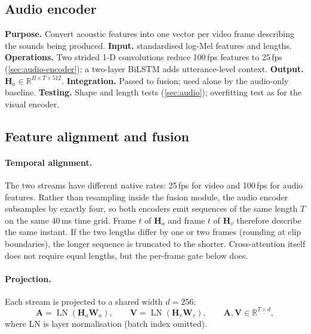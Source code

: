 \subsection{Audio encoder}
\textbf{Purpose.} Convert acoustic features into one vector per video frame
describing the sounds being produced.
\textbf{Input.}  standardised log-Mel features and lengths.
\textbf{Operations.} Two strided 1-D convolutions reduce 100\,fps features to
25\,fps (\cref{sec:audio-encoder}); a two-layer BiLSTM adds utterance-level
context.
\textbf{Output.} $\mathbf{H}_a \in \mathbb{R}^{B\times T\times 512}$.
\textbf{Integration.} Passed to fusion; used alone by the audio-only baseline.
\textbf{Testing.} Shape and length tests (\cref{sec:audio}); overfitting test as
for the visual encoder.

\subsection{Feature alignment and fusion}
\label{sec:fusion}

\paragraph{Temporal alignment.} The two streams have different native rates:
25\,fps for video and 100\,fps for audio features. Rather than resampling
inside the fusion module, the audio encoder subsamples by exactly four, so both
encoders emit sequences of the same length $T$ on the same 40\,ms time grid.
Frame $t$ of $\mathbf{H}_a$ and frame $t$ of $\mathbf{H}_v$ therefore describe the
same instant. If the two lengths differ by one or two frames (rounding at clip
boundaries), the longer sequence is truncated to the shorter. Cross-attention
itself does not require equal lengths, but the per-frame gate below does.

\paragraph{Projection.} Each stream is projected to a shared width $d=256$:
\begin{equation}
\mathbf{A} = \operatorname{LN}(\mathbf{H}_a\mathbf{W}_a), \qquad
\mathbf{V} = \operatorname{LN}(\mathbf{H}_v\mathbf{W}_v),
\qquad \mathbf{A},\mathbf{V}\in\mathbb{R}^{T\times d},
\end{equation}
where LN is layer normalisation (batch index omitted).

